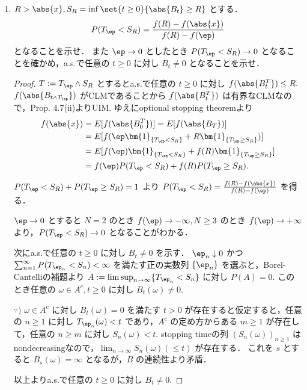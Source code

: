 \documentclass{jsarticle}
\begin{document}
\begin{enumerate}
    \item
    $R>\abs{x},S_R=\inf\set{t\ge0}{\abs{B_t}\ge R}$ とする．
    $$
    P(T_\ep<S_R)=\frac{f(R)-f(\abs{x})}{f(R)-f(\ep)}
    $$
    となることを示せ．
    また $\ep\to0$ としたとき $P(T_\ep<S_R)\to0$ となることを確かめ，a.s.で任意の $t\ge0$ に対し $B_t\neq0$ となることを示せ．
    \begin{proof}
        $T:=T_\ep\wedge S_R$ とするとa.s.で任意の $t\ge0$ に対し $f(\abs{B_t^T})\le R.$
        $f(\abs{B_{t\wedge T_\ep}})$ がCLMであることから $f(\abs{B_t^T})$ は有界なCLMなので，Prop. 4.7(ii)よりUIM.
        ゆえにoptional stopping theoremより
        \begin{align}
            f(\abs{x})
            &= E[f(\abs{B_0^T})]
            = E[f(\abs{B_T})] \\
            &= E[f(\ep\bm{1}_{\{T_\ep<S_R\}}+R\bm{1}_{\{T_\ep\ge S_R\}})] \\
            &= E[f(\ep)\bm{1}_{\{T_\ep<S_R\}}+f(R)\bm{1}_{\{T_\ep\ge S_R\}}] \\
            &= f(\ep)P(T_\ep<S_R)+f(R)P(T_\ep\ge S_R).
        \end{align}

        $P(T_\ep<S_R)+P(T_\ep\ge S_R)=1$ より $P(T_\ep<S_R)=\frac{f(R)-f(\abs{x})}{f(R)-f(\ep)}$ を得る．

        $\ep\to0$ とすると $N=2$ のとき $f(\ep)\to -\infty, N\ge3$ のとき $f(\ep)\to +\infty$ より，$P(T_\ep<S_R)\to0$ となることがわかる．

        次にa.s.で任意の $t\ge0$ に対し $B_t\neq0$ を示す．
        $\ep_n\downarrow0$ かつ $\sum_{n=1}^{\infty}P(T_{\ep_n}<S_n)<\infty$ を満たす正の実数列 $\{\ep_n\}$ を選ぶと，Borel-Cantelliの補題より $A:=\limsup_{n\to\infty}\{T_{\ep_n}<S_n\}$ に対し $P(A)=0.$
        このとき任意の $\omega\in A^c, t\ge0$ に対し $B_t(\omega)\neq0.$

        \begin{screen}
            $\because)$
            $\omega\in A^c$ に対し $B_t(\omega)=0$ を満たす $t>0$ が存在すると仮定すると，任意の $n\ge1$ に対し $T_{\ep_n}(\omega)<t$ であり，$A^c$ の定め方からある $m\ge1$ が存在して，任意の $n\ge m$ に対し $S_n(\omega)<t.$
            stopping timeの列 $(S_n(\omega))_{n\ge1}$ はnondecreasingなので，$\lim_{n\to\infty}S_n(\omega)(\le t)$ が存在する．
            これを $s$ とすると $B_s(\omega)=\infty$ となるが，$B$ の連続性より矛盾．
        \end{screen}

        以上よりa.s.で任意の $t\ge0$ に対し $B_t\neq0.$
    \end{proof}
    

\end{enumerate}
\end{document}
